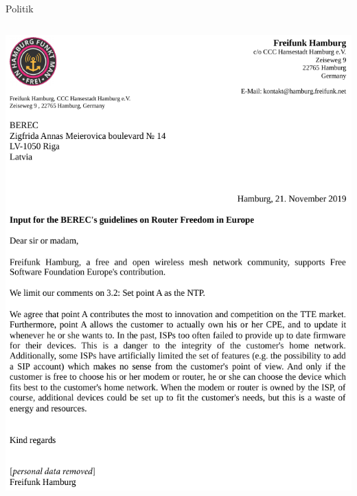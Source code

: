 \documentclass[t,aspectratio=169]{beamer}
\begin{document}
\begin{frame}{Politik}
\begin{columns}
\begin{column}{0.4\textwidth}
\begin{center}
          \includegraphics[height=0.8\textheight]{Bilder/berec}
        \end{center}
      \end{column}
    \end{columns}
  \end{frame}
  
\end{document}
